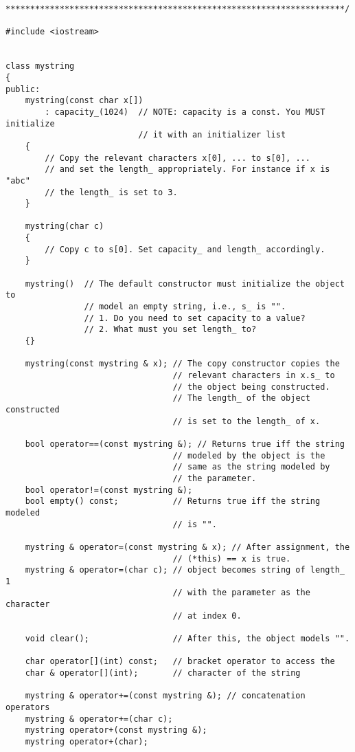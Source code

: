 {\begin{Verbatim}[frame=single]
*********************************************************************/

#include <iostream>


class mystring
{
public:
    mystring(const char x[])
        : capacity_(1024)  // NOTE: capacity is a const. You MUST initialize
                           // it with an initializer list
    {
        // Copy the relevant characters x[0], ... to s[0], ...
        // and set the length_ appropriately. For instance if x is "abc"
        // the length_ is set to 3.
    }

    mystring(char c)
    {
        // Copy c to s[0]. Set capacity_ and length_ accordingly.
    }

    mystring()  // The default constructor must initialize the object to
                // model an empty string, i.e., s_ is "".
                // 1. Do you need to set capacity to a value?
                // 2. What must you set length_ to?
    {}
    
    mystring(const mystring & x); // The copy constructor copies the
                                  // relevant characters in x.s_ to
                                  // the object being constructed.
                                  // The length_ of the object constructed
                                  // is set to the length_ of x.

    bool operator==(const mystring &); // Returns true iff the string
                                  // modeled by the object is the
                                  // same as the string modeled by
                                  // the parameter.
    bool operator!=(const mystring &);
    bool empty() const;           // Returns true iff the string modeled
                                  // is "".

    mystring & operator=(const mystring & x); // After assignment, the
                                  // (*this) == x is true.
    mystring & operator=(char c); // object becomes string of length_ 1
                                  // with the parameter as the character
                                  // at index 0.

    void clear();                 // After this, the object models "".

    char operator[](int) const;   // bracket operator to access the
    char & operator[](int);       // character of the string

    mystring & operator+=(const mystring &); // concatenation operators
    mystring & operator+=(char c);
    mystring operator+(const mystring &);
    mystring operator+(char);


\end{Verbatim}}
